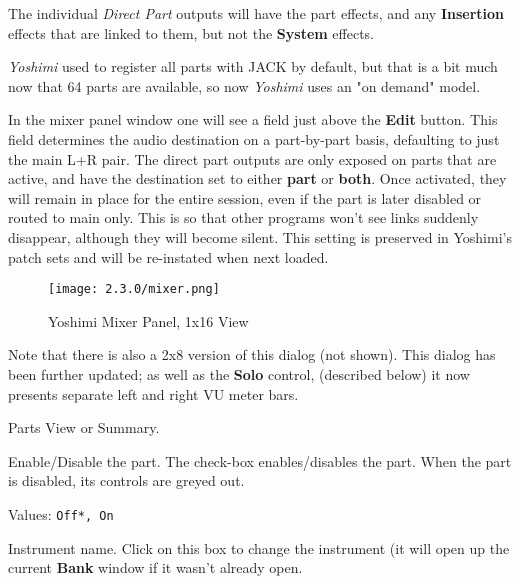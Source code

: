    The individual \textsl{Direct Part} outputs will have the part effects, and any
   \textbf{Insertion} effects that are linked to them, but not the
   \textbf{System} effects.

   \textsl{Yoshimi} used to register all parts with JACK by default, but that
   is a bit much now that 64 parts are available, so now \textsl{Yoshimi}
   uses an "on demand" model.

   In the mixer panel window one will see a field just above the
   \textbf{Edit} button.
   This field determines the audio destination on a part-by-part basis,
   defaulting to just the main L+R pair. The direct part outputs are only
   exposed on parts that are active, and have the destination set to either
   \textbf{part} or \textbf{both}.
   Once activated, they will remain in place for the entire session, even if
   the part is later disabled or routed to main only. This is so that other
   programs won't see links suddenly disappear, although they will become
   silent.  This setting is preserved in Yoshimi's patch sets and will be
   re-instated when next loaded.

\begin{figure}[H]
   \centering
   \texttt{[image: 2.3.0/mixer.png]}
   \caption[Yoshimi Mixer Panel]{Yoshimi Mixer Panel, 1x16 View}
   \label{fig:yoshimi_part_panel_1x16}
\end{figure}

   Note that there is also a 2x8 version of this dialog (not shown).
   This dialog has been further updated; as well as the \textbf{Solo}
   control, (described below) it now presents separate left and right
   VU meter bars.

   \setcounter{ItemCounter}{0}      %

   Parts View or Summary.

   Enable/Disable the part. The check-box enables/disables the part.
   When the part is disabled, its controls are greyed out.

   Values: \texttt{Off*, On}

   Instrument name. Click on this box to change the instrument (it will
   open up the current \textbf{Bank} window if it wasn't already open.

